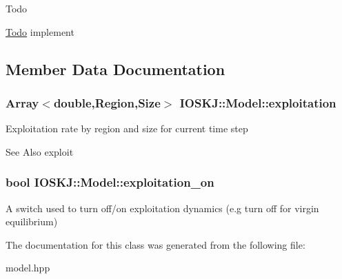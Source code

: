 \begin{DoxyRefDesc}{Todo}
\item[\hyperlink{todo__todo000003}{Todo}]implement \end{DoxyRefDesc}


\subsection{Member Data Documentation}
\hypertarget{classIOSKJ_1_1Model_ad4379e82be5723f2e1b58e9492dde3dc}{
\subsubsection[{exploitation}]{\setlength{\rightskip}{0pt plus 5cm}Array$<$double,Region,Size$>$ I\-O\-S\-K\-J\-::\-Model\-::exploitation}}\label{classIOSKJ_1_1Model_ad4379e82be5723f2e1b58e9492dde3dc}
Exploitation rate by region and size for current time step

\begin{DoxySeeAlso}{See Also}
exploit 
\end{DoxySeeAlso}
\hypertarget{classIOSKJ_1_1Model_ab9afc5bae0ac8e16817802e54bdfa60d}{
\subsubsection[{exploitation\-\_\-on}]{\setlength{\rightskip}{0pt plus 5cm}bool I\-O\-S\-K\-J\-::\-Model\-::exploitation\-\_\-on}}\label{classIOSKJ_1_1Model_ab9afc5bae0ac8e16817802e54bdfa60d}
A switch used to turn off/on exploitation dynamics (e.\-g turn off for virgin equilibrium) 

The documentation for this class was generated from the following file\-:\begin{DoxyCompactItemize}
\item 
model.\-hpp\end{DoxyCompactItemize}
